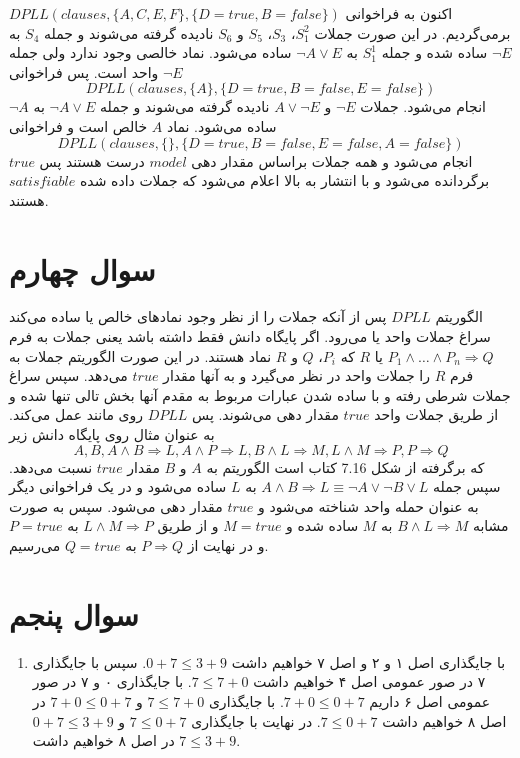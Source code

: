 \documentclass{article}
\begin{document}
اکنون به فراخوانی
$DPLL(clauses, \{A, C, E, F\}, \{D = true, B = false\})$
برمی‌گردیم. در این صورت جملات $S_{1}^{2}$، $S_3$، $S_5$ و $S_6$ نادیده گرفته می‌شوند و جمله $S_4$ به $\neg E$ ساده شده و جمله $S_{1}^{1}$ به $\neg A \vee E$ ساده می‌شود. نماد خالصی وجود ندارد ولی جمله 
$\neg E$
واحد است. پس فراخوانی 
$$DPLL(clauses, \{A\}, \{D = true, B = false, E = false\})$$
انجام می‌شود. جملات $\neg E$ و $A \vee \neg E$ نادیده گرفته می‌شوند و جمله $\neg A \vee E$ به $\neg A$ ساده می‌شود. نماد $A$ خالص است و فراخوانی 
$$DPLL(clauses, \{\}, \{D = true, B = false, E = false, A = false\})$$
انجام می‌شود و همه جملات براساس مقدار دهی $model$ درست هستند پس $true$ برگردانده می‌شود و با انتشار به بالا اعلام می‌شود که جملات داده شده $satisfiable$ هستند.
\section*{
سوال چهارم
}
الگوریتم 
$DPLL$
پس از آنکه جملات را از نظر وجود نماد‌های خالص یا  ساده می‌کند سراغ جملات واحد یا  می‌رود. اگر پایگاه دانش فقط  داشته باشد یعنی جملات به فرم 
$P_1 \wedge \dots \wedge P_n \Longrightarrow Q$
یا 
$R$
که $P_i$، $Q$ و $R$ نماد هستند. در این صورت الگوریتم جملات به فرم $R$ را جملات واحد در نظر می‌گیرد و به آنها مقدار $true$ می‌دهد. سپس سراغ جملات شرطی رفته و با ساده شدن عبارات مربوط به مقدم آنها بخش تالی تنها شده و از طریق جملات واحد 
$true$
مقدار دهی می‌شوند. پس $DPLL$ روی  مانند  عمل می‌کند. به عنوان مثال روی پایگاه دانش زیر
$$A, B, A \wedge B \Rightarrow L, A \wedge P \Rightarrow L, B \wedge L \Rightarrow M, L \wedge M \Rightarrow P, P \Rightarrow Q$$
که برگرفته از شکل 7.16 کتاب است الگوریتم به 
$A$
و  
$B$ 
مقدار $true$ نسبت می‌دهد. سپس جمله
$A \wedge B \Rightarrow L \equiv \neg A \vee \neg B \vee L$
به $L$ ساده می‌شود و در یک فراخوانی دیگر به عنوان حمله واحد شناخته می‌شود و $true$ مقدار دهی می‌شود. سپس به صورت مشابه
$B \wedge L \Rightarrow M$
به $M$ ساده شده و $M = true$ و از طریق 
$L \wedge M \Rightarrow P$
به $P =true$ و در نهایت از $P \Rightarrow Q$ به $Q = true$ می‌رسیم.
\section*{
سوال پنجم
}
\begin{enumerate}
	\item 
	با جایگذاری اصل ۱ و ۲ و اصل ۷ خواهیم داشت 
	$0 + 7 \leq 3 + 9$.
	سپس با جایگذاری ۷ در صور عمومی اصل ۴ خواهیم داشت
	$7 \leq 7 + 0$.
	با جایگذاری ۰ و ۷ در صور عمومی اصل ۶ داریم
	$7 + 0 \leq 0 + 7$.
	با جایگذاری $7 \leq 7 + 0$ و $7 + 0 \leq 0 + 7$ در اصل ۸ خواهیم داشت
	$7 \leq 0 + 7$.
	در نهایت با جایگذاری $7 \leq 0 + 7$ و $0 + 7 \leq 3 + 9$ در اصل ۸ خواهیم داشت 
	$7 \leq 3 + 9$.
\end{enumerate}
\end{document}
